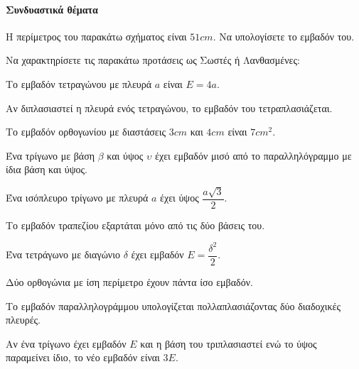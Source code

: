 \documentclass[11pt,a4paper,modern]{FFExercises}
\begin{document}
\paragraph{Συνδυαστικά θέματα}
\askhsh Η περίμετρος του παρακάτω σχήματος είναι $51\si{cm}$. Να υπολογίσετε το εμβαδόν του.
\begin{center}
\end{center}
\askhsh Να χαρακτηρίσετε τις παρακάτω προτάσεις ως Σωστές ή Λανθασμένες:
\begin{alist}
\item Το εμβαδόν τετραγώνου με πλευρά $a$ είναι $E=4a$.
\item Αν διπλασιαστεί η πλευρά ενός τετραγώνου, το εμβαδόν του τετραπλασιάζεται.
\item Το εμβαδόν ορθογωνίου με διαστάσεις $3\si{cm}$ και $4\si{cm}$ είναι $7\si{cm^2}$.
\item Ένα τρίγωνο με βάση $\beta$ και ύψος $\upsilon$ έχει εμβαδόν μισό από το παραλληλόγραμμο με ίδια βάση και ύψος.
\item Ένα ισόπλευρο τρίγωνο με πλευρά $a$ έχει ύψος $\dfrac{a\sqrt{3}}{2}$.
\item Το εμβαδόν τραπεζίου εξαρτάται μόνο από τις δύο βάσεις του.
\item Ένα τετράγωνο με διαγώνιο $\delta$ έχει εμβαδόν $E=\dfrac{\delta^2}{2}$.
\item Δύο ορθογώνια με ίση περίμετρο έχουν πάντα ίσο εμβαδόν.
\item Το εμβαδόν παραλληλογράμμου υπολογίζεται πολλαπλασιάζοντας δύο διαδοχικές πλευρές.
\item Αν ένα τρίγωνο έχει εμβαδόν $E$ και η βάση του τριπλασιαστεί ενώ το ύψος παραμείνει ίδιο, το νέο εμβαδόν είναι $3E$.
\end{alist}
\end{document}
